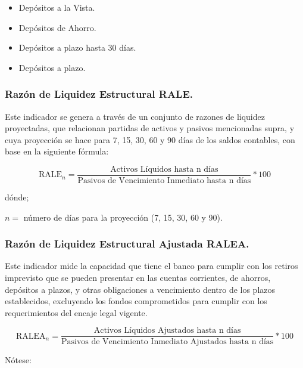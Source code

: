 \documentclass[10pt,]{article}
\providecommand{\tightlist}{%
  \setlength{\itemsep}{0pt}\setlength{\parskip}{0pt}}
\begin{document}
\begin{itemize}
\tightlist
\item
  Depósitos a la Vista.\\
\item
  Depósitos de Ahorro.\\
\item
  Depósitos a plazo hasta 30 días.
\item
  Depósitos a plazo.
\end{itemize}

\hypertarget{razon-de-liquidez-estructural-rale.}{%
\subsubsection{\texorpdfstring{\textbf{Razón de Liquidez Estructural}
RALE.}{Razón de Liquidez Estructural RALE.}}\label{razon-de-liquidez-estructural-rale.}}

Este indicador se genera a través de un conjunto de razones de liquidez
proyectadas, que relacionan partidas de activos y pasivos mencionadas
supra, y cuya proyección se hace para 7, 15, 30, 60 y 90 días de los
saldos contables, con base en la siguiente fórmula:

\[\text{RALE}_n = \frac{\text{Activos Líquidos hasta n días}}{\text{Pasivos de Vencimiento Inmediato hasta n días}}*100\]

dónde;

\(n=\) número de días para la proyección (7, 15, 30, 60 y 90).

\hypertarget{razon-de-liquidez-estructural-ajustada-ralea.}{%
\subsubsection{\texorpdfstring{\textbf{Razón de Liquidez Estructural
Ajustada}
RALEA.}{Razón de Liquidez Estructural Ajustada RALEA.}}\label{razon-de-liquidez-estructural-ajustada-ralea.}}

Este indicador mide la capacidad que tiene el banco para cumplir con los
retiros imprevisto que se pueden presentar en las cuentas corrientes, de
ahorros, depósitos a plazos, y otras obligaciones a vencimiento dentro
de los plazos establecidos, excluyendo los fondos comprometidos para
cumplir con los requerimientos del encaje legal vigente.

\[\text{RALEA}_n = \frac{\text{Activos Líquidos Ajustados hasta n días}}{\text{Pasivos de Vencimiento Inmediato Ajustados hasta n días}}*100\]

Nótese:
\end{document}
